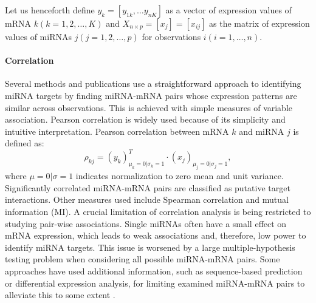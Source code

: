 

Let us henceforth define $y_k = [y_{1k}, \dotsc y_{nK}]$ as a vector of expression
values of mRNA $k (k = 1, 2, \dotsc, K)$ and $X_{n \times p} = [x_j] =
[x_{ij}]$ as the matrix of expression values of miRNAs $j (j = 1, 2, \ldots,
p)$ for observations $i (i = 1, \ldots, n)$.

\paragraph{Correlation}
Several methods and publications use a straightforward approach to identifying
miRNA targets by finding miRNA-mRNA pairs whose expression patterns are
similar across observations. This is achieved with simple measures of variable
association. Pearson correlation is widely used because of its simplicity
and intuitive interpretation. Pearson correlation between mRNA $k$ and miRNA
$j$ is defined as:
\begin{equation}
	\rho_{kj} = (y_k)_{\mu_k=0|\sigma_k=1}^T \cdot (x_j)_{\mu_j=0|\sigma_j=1},
	\label{eq:pearson}
\end{equation}
where $\mu=0|\sigma=1$ indicates normalization to zero mean and unit
variance. Significantly correlated miRNA-mRNA pairs are classified as putative
target interactions. Other measures used include Spearman correlation and
mutual information (MI). A crucial limitation of correlation analysis is being
restricted to studying pair-wise associations. Single miRNAs often have a
small effect on mRNA expression, which leads to weak associations and,
therefore, low power to identify miRNA targets. This issue is worsened by a
large multiple-hypothesis testing problem when considering all possible miRNA-mRNA
pairs. Some approaches have used additional information, such as
sequence-based prediction or differential expression analysis, for limiting
examined miRNA-mRNA pairs to alleviate this to some extent
\citep{Muniategui2013}.

